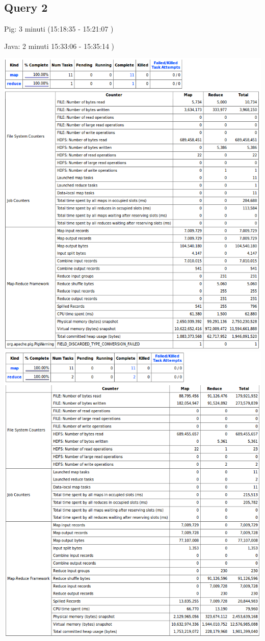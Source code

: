\documentclass[11pt]{article} %
\begin{document}
\subsection{Query 2}
Pig: 3 minuti	 (15:18:35 -  15:21:07 )

Java: 2 minuti	 15:33:06 - 15:35:14 )

\includegraphics[scale=0.8]{pig2.png}
\includegraphics[scale=0.8]{java2.png}
\end{document}
